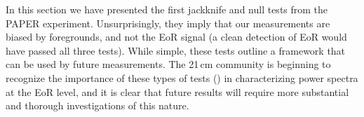 \documentclass[preprint2,numberedappendix,tighten]{aastex6}  %
\begin{document}

In this section we have presented the first jackknife and null tests from the PAPER experiment. Unsurprisingly, they imply that our measurements are biased by foregrounds, and not the EoR signal (a clean detection of EoR would have passed all three tests). While simple, these tests outline a framework that can be used by future measurements. The 21\,cm community is beginning to recognize the importance of these types of tests (\citealt{pober_et_al2016b}) in characterizing power spectra at the EoR level, and it is clear that future results will require more substantial and thorough investigations of this nature.


\end{document}
